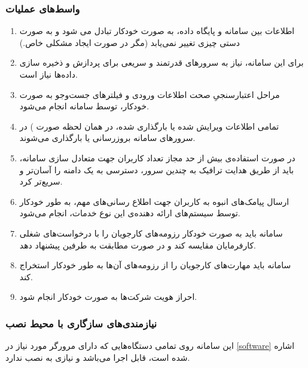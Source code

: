\subsubsection{واسط‌های عملیات}
\begin{enumerate}
	\item
	اطلاعات بین سامانه و پایگاه داده، به صورت خودکار تبادل می شود و به صورت دستی چیزی تغییر نمی‌یابد (مگر در صورت ایجاد مشکلی خاص.)
	\item
	برای این سامانه، نیاز به سرورهای قدرتمند و سریعی برای پردازش و ذخیره سازی داده‌ها نیاز است.
	\item
	مراحل اعتبارسنجیِ صحت اطلاعات ورودی و فیلترهای جست‌و‌جو به صورت خودکار، توسط سامانه انجام می‌شود.
	\item
	تمامی اطلاعات ویرایش شده یا بارگذاری شده، در همان لحظه
	صورت  )	 در سرور‌های سامانه بروزرسانی یا بارگذاری می‌شوند.
	\item
	در صورت استفاده‌ی بیش از حد مجاز تعداد کاربران جهت متعادل سازی سامانه، باید از طریق هدایت ترافیک به چندین سرور، دسترسی به یک دامنه را آسان‌تر و سریع‌تر کرد.
	\item
	ارسال پیامک‌های انبوه به کاربران جهت اطلاع رسانی‌های مهم، به طور خودکار توسط سیستم‌های ارائه دهنده‌ی این نوع خدمات، انجام می‌شود.
	\item
	سامانه باید به صورت خودکار رزومه‌های کارجویان را با درخواست‌های شغلی کارفرمایان مقایسه کند و در صورت مطابقت به طرفین پیشنهاد دهد.
	\item
	سامانه باید مهارت‌های کارجویان را از رزومه‌های آن‌ها به طور خودکار استخراج کند.
	\item
	احراز هویت شرکت‌ها به صورت خودکار انجام شود.
\end{enumerate}

\subsubsection{نیازمندی‌های سازگاری با محیط نصب}
این سامانه روی تمامی دستگاه‌هایی که دارای مرورگر مورد نیاز در \ref{software} اشاره شده است، قابل اجرا می‌باشد و نیازی به نصب ندارد.


